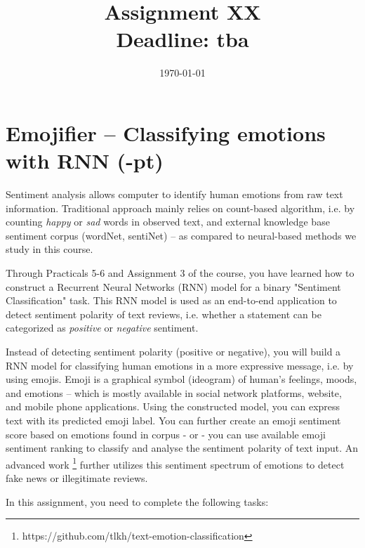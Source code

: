 \documentclass[a4paper,twoside,10pt]{article}
\title{\vspace{-\baselineskip}\sffamily\bfseries Assignment XX \\
\large Deadline: tba}
\date{\today}
\begin{document}
\maketitle

\section*{Emojifier -- Classifying emotions with RNN (-pt)}

Sentiment analysis allows computer to identify human emotions from raw text information. Traditional approach mainly relies on count-based algorithm, i.e. by counting \textit{happy} or \textit{sad} words in observed text, and external knowledge base sentiment corpus (wordNet, sentiNet) -- as compared to neural-based methods we study in this course. 

\justify
Through Practicals 5-6 and Assignment 3 of the course, you have learned how to construct a Recurrent Neural Networks (RNN) model for a binary "Sentiment Classification" task.  This RNN model is used as an end-to-end application to detect sentiment polarity of text reviews, i.e. whether a statement can be categorized as \textit{positive} or \textit{negative} sentiment.

\justify
Instead of detecting sentiment polarity (positive or negative), you will build a RNN model for classifying human emotions in a more expressive message, i.e. by using emojis. Emoji is a graphical symbol (ideogram) of human's feelings, moods, and emotions -- which is mostly available in social network platforms, website, and mobile phone applications. Using the constructed model, you can express text with its predicted emoji label. You can further create an emoji sentiment score based on emotions found in corpus - or - you can use available emoji sentiment ranking to classify and analyse the sentiment polarity of text input. An advanced work \footnote{https://github.com/tlkh/text-emotion-classification} further utilizes this sentiment spectrum of emotions to detect fake news or illegitimate reviews.

\justify
In this assignment, you need to complete the following tasks:
\end{document}
